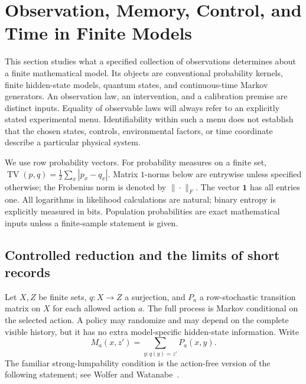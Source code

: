 \section{Observation, Memory, Control, and Time in Finite Models}
\label{op:chapter}

This section studies what a specified collection of observations determines about
a finite mathematical model.  Its objects are conventional probability kernels,
finite hidden-state models, quantum states, and continuous-time Markov generators.
An observation law, an intervention, and a calibration premise are distinct
inputs.  Equality of observable laws will always refer to an explicitly stated
experimental menu.  Identifiability within such a menu does not establish that
the chosen states, controls, environmental factors, or time coordinate describe
a particular physical system.

We use row probability vectors.  For probability measures on a finite set,
\(\operatorname{TV}(p,q)=\frac12\sum_x|p_x-q_x|\).
Matrix \(1\)-norms below are entrywise unless specified otherwise; the Frobenius
norm is denoted by \(\|\cdot\|_F\).  The vector \(\mathbf1\) has all entries one.
All logarithms in likelihood calculations are natural; binary entropy is
explicitly measured in bits.  Population probabilities are exact mathematical
inputs unless a finite-sample statement is given.

\subsection{Controlled reduction and the limits of short records}
\label{op:reduction}

Let \(X,Z\) be finite sets, \(q:X\to Z\) a surjection, and \(P_a\) a
row-stochastic transition matrix on \(X\) for each allowed action \(a\).
The full process is Markov conditional on the selected action.  A policy may
randomize and may depend on the complete visible history, but it has no extra
model-specific hidden-state information.  Write
\[
 M_a(x,z')=\sum_{y:q(y)=z'}P_a(x,y).
\]
The familiar strong-lumpability condition is the action-free version of the
following statement; see Wolfer and Watanabe~\cite{op:wolfer}.

